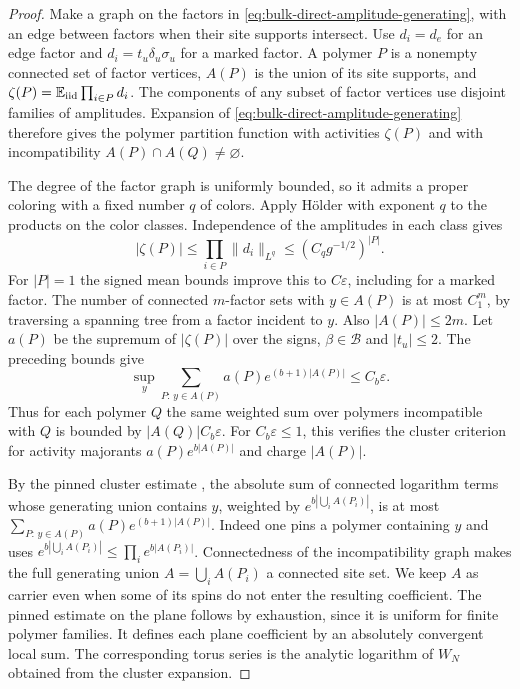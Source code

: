 \documentclass[11pt]{article}
\newcommand{\E}{\mathbb E}
\theoremstyle{definition}
\begin{document}
\begin{proof}
Make a graph on the factors in \eqref{eq:bulk-direct-amplitude-generating},
with an edge between factors when their site supports intersect.
Use \(d_i=d_e\) for an edge factor and \(d_i=t_u\delta_u\sigma_u\)
for a marked factor. A polymer \(P\) is a nonempty connected set
of factor vertices, \(A(P)\) is the union of its site supports, and
\(\zeta(P)=\E_{\rm iid}\prod_{i\in P}d_i\).
The components of any subset of factor vertices use disjoint
families of amplitudes. Expansion of \eqref{eq:bulk-direct-amplitude-generating}
therefore gives the polymer partition function with activities
\(\zeta(P)\) and with incompatibility \(A(P)\cap A(Q)\ne\varnothing\).

The degree of the factor graph is uniformly bounded, so it admits
a proper coloring with a fixed number \(q\) of colors. Apply
H\"older with exponent \(q\) to the products on the color classes.
Independence of the amplitudes in each class gives
\[
 |\zeta(P)|\le \prod_{i\in P}\|d_i\|_{L^q}
             \le (C_q g^{-1/2})^{|P|}.
\]
For \(|P|=1\) the signed mean bounds improve this to \(C\varepsilon\),
including for a marked factor. The number of connected \(m\)-factor
sets with \(y\in A(P)\) is at most \(C_1^m\), by traversing a
spanning tree from a factor incident to \(y\). Also \(|A(P)|\le2m\).
Let \(a(P)\) be the supremum of \(|\zeta(P)|\) over the signs,
\(\beta\in\mathcal B\) and \(|t_u|\le2\). The preceding bounds give
\[
 \sup_y\sum_{P:\,y\in A(P)} a(P)e^{(b+1)|A(P)|}\le C_b\varepsilon.
\]
Thus for each polymer \(Q\) the same weighted sum over polymers
incompatible with \(Q\) is bounded by \(|A(Q)|C_b\varepsilon\).
For \(C_b\varepsilon\le1\), this verifies the cluster criterion
for activity majorants \(a(P)e^{b|A(P)|}\) and charge \(|A(P)|\).

By the pinned cluster estimate \cite[Theorem 1]{Ueltschi}, the
absolute sum of connected logarithm terms whose generating union
contains \(y\), weighted by \(e^{b|\bigcup_i A(P_i)|}\), is at most
\(\sum_{P:\,y\in A(P)}a(P)e^{(b+1)|A(P)|}\).
Indeed one pins a polymer containing \(y\) and uses
\(e^{b|\bigcup_i A(P_i)|}\le\prod_i e^{b|A(P_i)|}\).
Connectedness of the incompatibility graph makes the full
generating union \(A=\bigcup_i A(P_i)\) a connected site set.
We keep \(A\) as carrier even when some of its spins do not enter
the resulting coefficient. The pinned estimate on the plane
follows by exhaustion, since it is uniform for finite polymer
families. It defines each plane coefficient by an absolutely
convergent local sum. The corresponding torus series is the
analytic logarithm of \(W_N\) obtained from the cluster expansion.


\end{proof}
\end{document}
